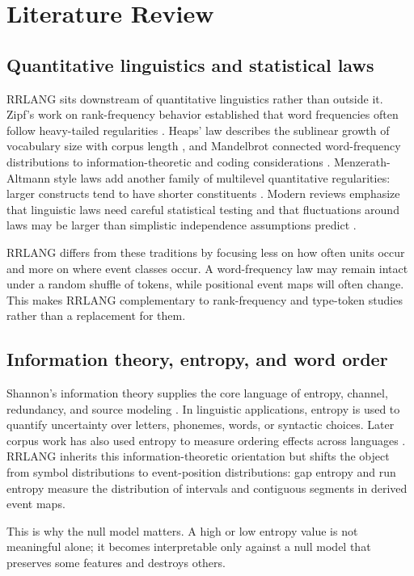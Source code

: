 \documentclass[11pt,a4paper]{article}
\newcommand{\RRLANG}{\textsc{RRLANG}}
\begin{document}
\section{Literature Review}
\subsection{Quantitative linguistics and statistical laws}
\RRLANG{} sits downstream of quantitative linguistics rather than outside it. Zipf's work on rank-frequency behavior established that word frequencies often follow heavy-tailed regularities \cite{zipf1949}. Heaps' law describes the sublinear growth of vocabulary size with corpus length \cite{heaps1978}, and Mandelbrot connected word-frequency distributions to information-theoretic and coding considerations \cite{mandelbrot1953}. Menzerath-Altmann style laws add another family of multilevel quantitative regularities: larger constructs tend to have shorter constituents \cite{menzerath}. Modern reviews emphasize that linguistic laws need careful statistical testing and that fluctuations around laws may be larger than simplistic independence assumptions predict \cite{altmann2015}.

\RRLANG{} differs from these traditions by focusing less on how often units occur and more on where event classes occur. A word-frequency law may remain intact under a random shuffle of tokens, while positional event maps will often change. This makes \RRLANG{} complementary to rank-frequency and type-token studies rather than a replacement for them.

\subsection{Information theory, entropy, and word order}
Shannon's information theory supplies the core language of entropy, channel, redundancy, and source modeling \cite{shannon1948}. In linguistic applications, entropy is used to quantify uncertainty over letters, phonemes, words, or syntactic choices. Later corpus work has also used entropy to measure ordering effects across languages \cite{montemurro2011}. \RRLANG{} inherits this information-theoretic orientation but shifts the object from symbol distributions to event-position distributions: gap entropy and run entropy measure the distribution of intervals and contiguous segments in derived event maps.

This is why the null model matters. A high or low entropy value is not meaningful alone; it becomes interpretable only against a null model that preserves some features and destroys others.
\end{document}
